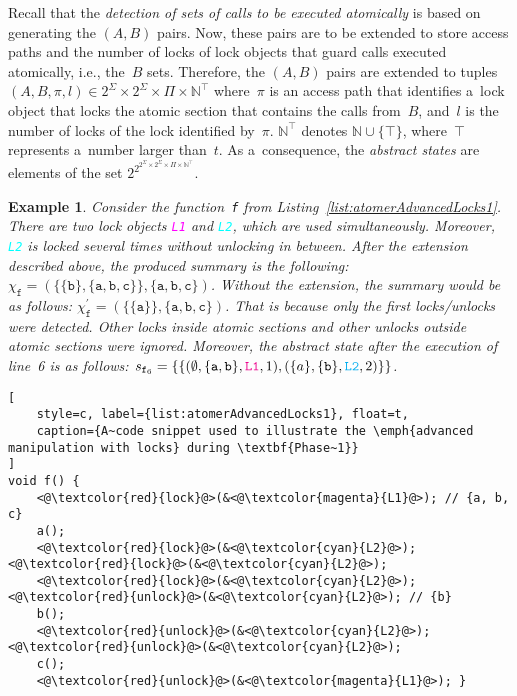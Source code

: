 \documentclass{ExcelAtFIT}
\theoremstyle{example}
\newtheorem{example}{Example}[section]
\begin{document}
Recall that the \emph{detection of sets of calls to be executed atomically} is based on generating the ${ (A, B) }$ pairs. Now, these pairs are to be extended to store access paths and the number of locks of lock objects that guard calls executed atomically, i.e., the~$ B $ sets. Therefore, the ${ (A, B) }$ pairs are extended to tuples $ (A, B, \pi, \allowbreak l) \in 2^\Sigma \times 2^\Sigma \times \Pi \times \mathbb{N}^\top $ where~$ \pi $ is an access path that identifies a~lock object that locks the atomic section that contains the calls from~$ B $, and~$ l $ is the number of locks of the lock identified by~$ \pi $. $ \mathbb{N}^\top $ denotes $ \mathbb{N} \cup \{\top\} $, where~$ \top $ represents a~number larger than~$ t $. As a~consequence, the \emph{abstract states} are elements of the set $ 2^{2^{2^\Sigma \times 2^\Sigma \times \Pi \times \mathbb{N}^\top}} $.

\begin{example}
    Consider the function~\texttt{f} from Listing~\ref{list:atomerAdvancedLocks1}. There are two lock objects \textcolor{magenta}{\texttt{L1}} and \textcolor{cyan}{\texttt{L2}}, which are used simultaneously. Moreover, \textcolor{cyan}{\texttt{L2}} is locked several times without unlocking in between. After the extension described above, the produced \emph{summary} is the following: $ \chi_\mathtt{f} = ({\{\{\mathtt{b}\}, \{\mathtt{a}, \mathtt{b}, \mathtt{c}\}\}}, {\{\mathtt{a}, \mathtt{b}, \mathtt{c}\}}) $. Without the extension, the summary would be as follows: $ \chi_\mathtt{f}^\prime = ({\{\{\mathtt{a}\}\}}, {\{\mathtt{a}, \mathtt{b}, \mathtt{c}\}}) $. That is because only the first locks/unlocks were detected. Other locks inside atomic sections and other unlocks outside atomic sections were ignored. Moreover, the abstract state after the execution of line~6 is as follows: $ s_{\mathtt{f}_6} = \{\{{(\emptyset, \{\mathtt{a, b}\}, \textcolor{magenta}{\mathtt{L1}}, 1)}, \allowbreak {(\{a\}, \{\mathtt{b}\}, \textcolor{cyan}{\mathtt{L2}}, 2)}\}\} $.
\end{example}

\begin{lstlisting}[
    style=c, label={list:atomerAdvancedLocks1}, float=t,
    caption={A~code snippet used to illustrate the \emph{advanced manipulation with locks} during \textbf{Phase~1}}
]
void f() {
    <@\textcolor{red}{lock}@>(&<@\textcolor{magenta}{L1}@>); // {a, b, c}
    a();
    <@\textcolor{red}{lock}@>(&<@\textcolor{cyan}{L2}@>); <@\textcolor{red}{lock}@>(&<@\textcolor{cyan}{L2}@>);
    <@\textcolor{red}{lock}@>(&<@\textcolor{cyan}{L2}@>); <@\textcolor{red}{unlock}@>(&<@\textcolor{cyan}{L2}@>); // {b}
    b();
    <@\textcolor{red}{unlock}@>(&<@\textcolor{cyan}{L2}@>); <@\textcolor{red}{unlock}@>(&<@\textcolor{cyan}{L2}@>);
    c();
    <@\textcolor{red}{unlock}@>(&<@\textcolor{magenta}{L1}@>); }
\end{lstlisting}
\end{document}
